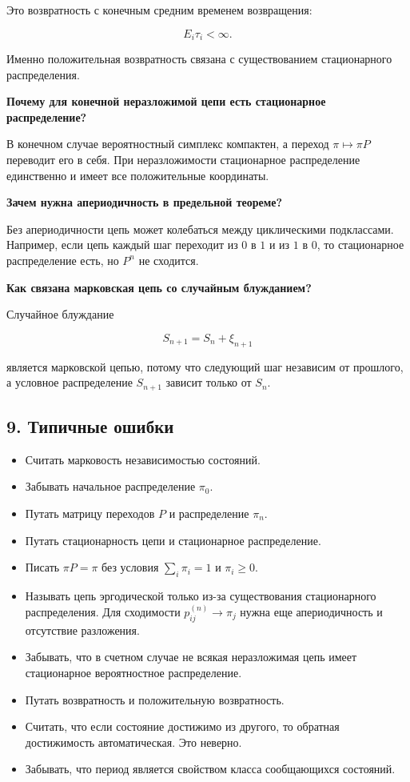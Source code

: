 \documentclass[
  11pt,
  a4paper,
]{article}
\providecommand{\tightlist}{%
  \setlength{\itemsep}{0pt}\setlength{\parskip}{0pt}}
\begin{document}
Это возвратность с конечным средним временем возвращения:

\[
E_i\tau_i<\infty.
\]

Именно положительная возвратность связана с существованием стационарного
распределения.

\textbf{Почему для конечной неразложимой цепи есть стационарное
распределение?}

В конечном случае вероятностный симплекс компактен, а переход
\(\pi\mapsto\pi P\) переводит его в себя. При неразложимости
стационарное распределение единственно и имеет все положительные
координаты.

\textbf{Зачем нужна апериодичность в предельной теореме?}

Без апериодичности цепь может колебаться между циклическими подклассами.
Например, если цепь каждый шаг переходит из \(0\) в \(1\) и из \(1\) в
\(0\), то стационарное распределение есть, но \(P^n\) не сходится.

\textbf{Как связана марковская цепь со случайным блужданием?}

Случайное блуждание

\[
S_{n+1}=S_n+\xi_{n+1}
\]

является марковской цепью, потому что следующий шаг независим от
прошлого, а условное распределение \(S_{n+1}\) зависит только от
\(S_n\).

\subsection{9. Типичные
ошибки}\label{ux442ux438ux43fux438ux447ux43dux44bux435-ux43eux448ux438ux431ux43aux438}

\begin{itemize}
\tightlist
\item
  Считать марковость независимостью состояний.
\item
  Забывать начальное распределение \(\pi_0\).
\item
  Путать матрицу переходов \(P\) и распределение \(\pi_n\).
\item
  Путать стационарность цепи и стационарное распределение.
\item
  Писать \(\pi P=\pi\) без условия \(\sum_i\pi_i=1\) и \(\pi_i\ge0\).
\item
  Называть цепь эргодической только из-за существования стационарного
  распределения. Для сходимости \(p_{ij}^{(n)}\to\pi_j\) нужна еще
  апериодичность и отсутствие разложения.
\item
  Забывать, что в счетном случае не всякая неразложимая цепь имеет
  стационарное вероятностное распределение.
\item
  Путать возвратность и положительную возвратность.
\item
  Считать, что если состояние достижимо из другого, то обратная
  достижимость автоматическая. Это неверно.
\item
  Забывать, что период является свойством класса сообщающихся состояний.
\end{itemize}
\end{document}
